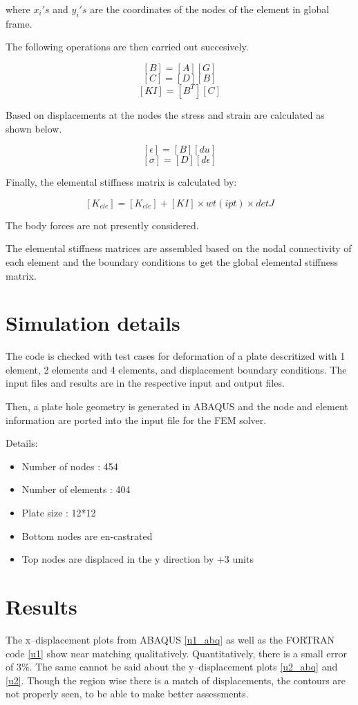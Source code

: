 \documentclass[review]{elsarticle}
\begin{document}
where $x_{i}'s$ and $y_{i}'s$ are the coordinates of the nodes of the element in global frame. 

The following operations are then carried out succesively.

\[ [B]=[A][G] \]
\[ [C]=[D][B] \]
\[ [KI]=[B^T][C] \]

Based on displacements at the nodes the stress and strain are calculated as shown below.

\[ [\epsilon]=[B][du] \]
\[ [\sigma]=[D][d\epsilon] \]

Finally, the elemental stiffness matrix is calculated by:

\[ [K_{ele}]=[K_{ele}]+[KI]\times wt(ipt) \times detJ \]

The body forces are not presently considered.

The elemental stiffness matrices are assembled based on the nodal connectivity of each element and the boundary conditions to get the global elemental stiffness matrix. \cite{smith2005programming}

\section*{Simulation details}
The code is checked with test cases for deformation of a plate descritized with 1 element, 2 elements and 4 elements, and displacement boundary conditions. The input files and results are in the respective input and output files.

Then, a plate hole geometry is generated in ABAQUS \citep{abaqus} and the node and element information are ported into the input file for the FEM solver.

Details:

\begin{itemize}
\item Number of nodes : 454
\item Number of elements : 404
\item Plate size : 12*12
\item Bottom nodes are en-castrated
\item Top nodes are displaced in the y direction by +3 units
\end{itemize}

\section*{Results}

The x--displacement plots from ABAQUS \ref{u1_abq} as well as the FORTRAN code \ref{u1} show near matching qualitatively. Quantitatively, there is a small error of 3\%.
The same cannot be said about the y--displacement plots \ref{u2_abq} and \ref{u2}. Though the region wise there is a match of displacements, the contours are not properly seen, to be able to make better assessments.
\end{document}
